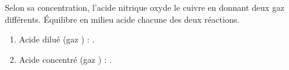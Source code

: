 \documentclass[11pt,a4paper]{article}
\begin{document}
\begin{exo}
Selon sa concentration, l'acide nitrique oxyde le cuivre en donnant deux gaz différents. Équilibre
en milieu acide chacune des deux réactions.
\begin{enumerate}[label=\alph*)]
  \item Acide dilué (gaz ) : .
  \item Acide concentré (gaz ) : .
\end{enumerate}
\end{exo}
\end{document}
